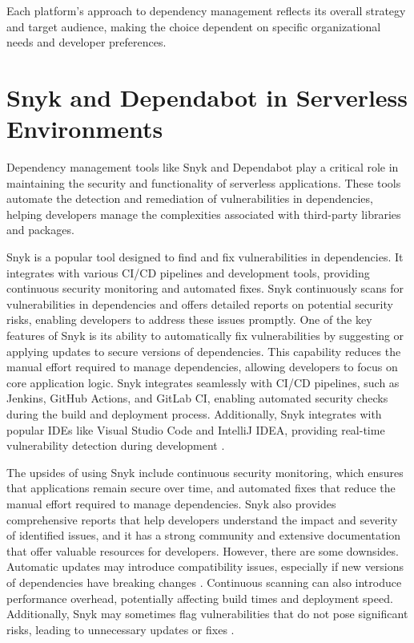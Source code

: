 \documentclass[sigconf]{acmart}
\begin{document}
Each platform's approach to dependency management reflects its overall strategy and target audience, making the choice dependent on specific organizational needs and developer preferences.

\section{Snyk and Dependabot in Serverless Environments}

Dependency management tools like Snyk and Dependabot play a critical role in maintaining the security and functionality of serverless applications. These tools automate the detection and remediation of vulnerabilities in dependencies, helping developers manage the complexities associated with third-party libraries and packages.

Snyk is a popular tool designed to find and fix vulnerabilities in dependencies. It integrates with various CI/CD pipelines and development tools, providing continuous security monitoring and automated fixes. Snyk continuously scans for vulnerabilities in dependencies and offers detailed reports on potential security risks, enabling developers to address these issues promptly. One of the key features of Snyk is its ability to automatically fix vulnerabilities by suggesting or applying updates to secure versions of dependencies. This capability reduces the manual effort required to manage dependencies, allowing developers to focus on core application logic. Snyk integrates seamlessly with CI/CD pipelines, such as Jenkins, GitHub Actions, and GitLab CI, enabling automated security checks during the build and deployment process. Additionally, Snyk integrates with popular IDEs like Visual Studio Code and IntelliJ IDEA, providing real-time vulnerability detection during development \cite{snyk2023, snykIDE2023}.

The upsides of using Snyk include continuous security monitoring, which ensures that applications remain secure over time, and automated fixes that reduce the manual effort required to manage dependencies. Snyk also provides comprehensive reports that help developers understand the impact and severity of identified issues, and it has a strong community and extensive documentation that offer valuable resources for developers. However, there are some downsides. Automatic updates may introduce compatibility issues, especially if new versions of dependencies have breaking changes \cite{benischke2023updates}. Continuous scanning can also introduce performance overhead, potentially affecting build times and deployment speed. Additionally, Snyk may sometimes flag vulnerabilities that do not pose significant risks, leading to unnecessary updates or fixes \cite{snykFalsePositives2023}.
\end{document}
